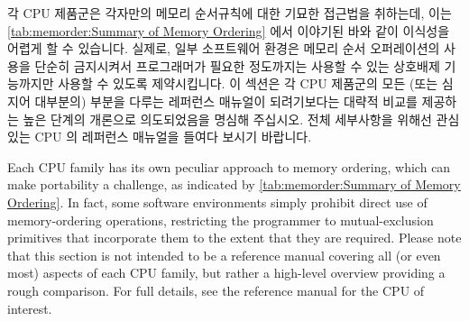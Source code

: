 \begin{table}[tb]
\vspace{5pt}\hfill
{}\OneColumnHSpace{-0.4in}
\caption{Summary of Memory Ordering}
\label{tab:memorder:Summary of Memory Ordering}
\end{table}

각 CPU 제품군은 각자만의 메모리 순서규칙에 대한 기묘한 접근법을 취하는데, 이는
\cref{tab:memorder:Summary of Memory Ordering} 에서 이야기된 바와 같이 이식성을
어렵게 할 수 있습니다.
실제로, 일부 소프트웨어 환경은 메모리 순서 오퍼레이션의 사용을 단순히
금지시켜서 프로그래머가 필요한 정도까지는 사용할 수 있는 상호배제 기능까지만
사용할 수 있도록 제약시킵니다.
이 섹션은 각 CPU 제품군의 모든 (또는 심지어 대부분의) 부분을 다루는 레퍼런스
매뉴얼이 되려기보다는 대략적 비교를 제공하는 높은 단계의 개론으로 의도되었음을
명심해 주십시오.
전체 세부사항을 위해선 관심 있는 CPU 의 레퍼런스 매뉴얼을 들여다 보시기
바랍니다.

\iffalse

Each CPU family has its own peculiar approach to memory ordering, which
can make portability a challenge, as indicated by
\cref{tab:memorder:Summary of Memory Ordering}.
In fact, some software environments simply prohibit
direct use of memory-ordering operations, restricting the programmer
to mutual-exclusion primitives that incorporate them to the extent that
they are required.  Please note that this section is not intended to be
a reference manual
covering all (or even most) aspects of each CPU family, but rather
a high-level overview providing a rough comparison.
For full details, see the reference manual for the CPU of interest.

